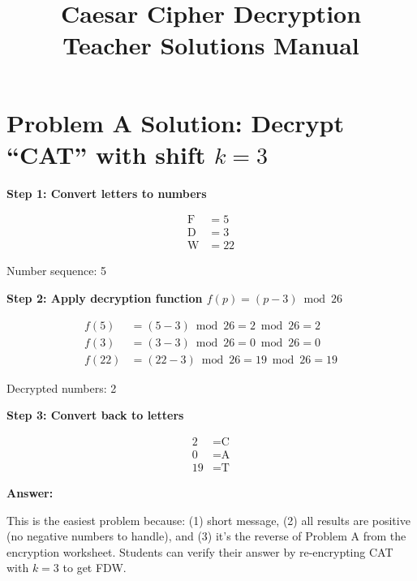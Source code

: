 \documentclass[12pt]{article}
\title{\textbf{Caesar Cipher Decryption} \\ Teacher Solutions Manual}
\date{}
\begin{document}
\maketitle

\section*{Problem A Solution: Decrypt ``CAT'' with shift $k=3$}

\textbf{Step 1: Convert letters to numbers}

\begin{align*}
\text{F} &= 5 \\
\text{D} &= 3 \\
\text{W} &= 22
\end{align*}

Number sequence: 5  

\vspace{0.3cm}

\textbf{Step 2: Apply decryption function $f(p) = (p - 3) \bmod 26$}

\begin{align*}
f(5) &= (5 - 3) \bmod 26 = 2 \bmod 26 = 2 \\
f(3) &= (3 - 3) \bmod 26 = 0 \bmod 26 = 0 \\
f(22) &= (22 - 3) \bmod 26 = 19 \bmod 26 = 19
\end{align*}

Decrypted numbers: 2  

\vspace{0.3cm}

\textbf{Step 3: Convert back to letters}

\begin{align*}
2 &= \text{C} \\
0 &= \text{A} \\
19 &= \text{T}
\end{align*}

\vspace{0.3cm}
\noindent\textbf{Answer:} 

\vspace{0.5cm}

\begin{tcolorbox}[colback=yellow!10!white,colframe=orange!50!black,title=\textbf{Teaching Note}]
This is the easiest problem because: (1) short message, (2) all results are positive (no negative numbers to handle), and (3) it's the reverse of Problem A from the encryption worksheet. Students can verify their answer by re-encrypting CAT with $k=3$ to get FDW.
\end{tcolorbox}
\end{document}
